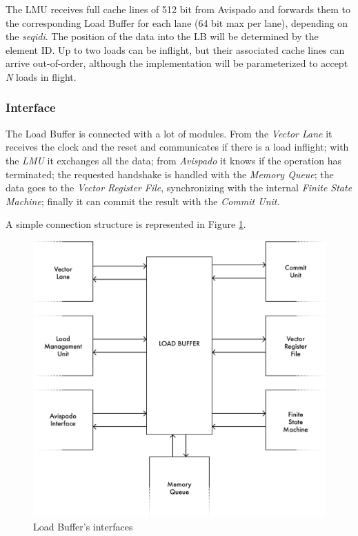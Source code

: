 The LMU receives full cache lines of 512 bit from Avispado and forwards them to the corresponding Load Buffer for each lane (64 bit max per lane), depending on the \emph{seq\+id\+i}. The position of the data into the LB will be determined by the element ID.
Up to two loads can be inflight, but their associated cache lines can arrive out-of-order, although the implementation will be parameterized to accept \emph{N} loads in flight.

\subsubsection{Interface}
The Load Buffer is connected with a lot of modules. From the \emph{Vector Lane} it receives the clock and the reset and communicates if there is a load inflight; with the \emph{LMU} it exchanges all the data; from \emph{Avispado} it knows if the operation has terminated; the requested handshake is handled with the \emph{Memory Queue}; the data goes to the \emph{Vector Register File}, synchronizing with the internal \emph{Finite State Machine}; finally it can commit the result with the \emph{Commit Unit}.

A simple connection structure is represented in Figure \ref{lb-if}.

\begin{figure}[H]
    \centering
    \includegraphics[scale = 0.6]{Chapter_2/img/lb-if.png}
    \caption{Load Buffer's interfaces}
    \label{lb-if}
\end{figure}

